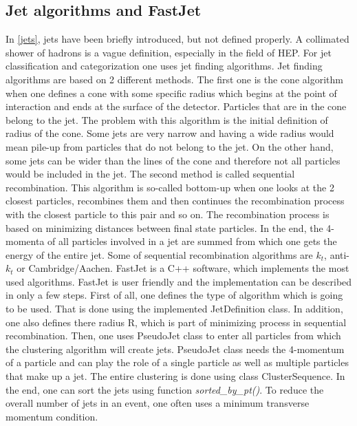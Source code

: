 \documentclass[a4paper,10pt]{article}
\begin{document}
\subsection{Jet algorithms and FastJet}
\label{fas}
In \autoref{jets}, jets have been briefly introduced, but not defined properly. A collimated shower of hadrons is a vague definition, especially in the field of HEP. For jet classification and categorization one uses jet finding algorithms.  Jet finding algorithms are based on 2 different methods.
\newline
\noindent  The first one is the cone algorithm when one defines a cone with some specific radius which begins at the point of interaction and ends at the surface of the detector. Particles that are in the cone belong to the jet. The problem with this algorithm is the initial definition of radius of the cone. Some jets are very narrow and having a wide radius would mean pile-up from particles that do not belong to the jet. On the other hand, some jets can be wider than the lines of the cone and therefore not all particles would be included in the jet\cite{Catani:2000xqw}. 
\newline
\noindent The second method is called sequential recombination\cite{Tseng_2013}. This algorithm is so-called bottom-up when one looks at the 2 closest particles, recombines them and then continues the recombination process with the closest particle to this pair and so on. The recombination process is based on minimizing distances between final state particles\cite{Tseng_2013}. In the end, the 4-momenta of all particles involved in a jet are summed from which one gets the energy of the entire jet. Some of sequential recombination algorithms are $k_t$, anti-$k_t$ or Cambridge/Aachen.
\newline
\noindent FastJet is a C++ software, which implements the most used algorithms. FastJet is user friendly and the implementation can be described in only a few steps. First of all, one defines the type of algorithm which is going to be used. That is done using the implemented JetDefinition class. In addition, one also defines there radius R, which is part of minimizing process in sequential recombination\cite{FastJet2011FastJet}. Then, one uses PseudoJet class to enter all particles from which the clustering algorithm will create jets. PseudoJet class needs the 4-momentum of a particle and can play the role of a single particle as well as multiple particles that make up a jet. The entire clustering is done using class ClusterSequence. In the end, one can sort the jets using function \textit{sorted\_by\_pt()}. To reduce the overall number of jets in an event, one often uses a minimum transverse momentum condition.
\end{document}
